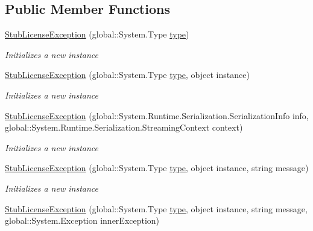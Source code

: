 \subsection*{Public Member Functions}
\begin{DoxyCompactItemize}
\item 
\hyperlink{class_system_1_1_component_model_1_1_fakes_1_1_stub_license_exception_a9083401910ae6269d240d9be7fb7ed57}{Stub\-License\-Exception} (global\-::\-System.\-Type \hyperlink{jquery-1_810_82-vsdoc_8js_a3940565e83a9bfd10d95ffd27536da91}{type})
\begin{DoxyCompactList}\small\item\em Initializes a new instance\end{DoxyCompactList}\item 
\hyperlink{class_system_1_1_component_model_1_1_fakes_1_1_stub_license_exception_a130bbaa9121179a905b6ed68ccc7aeab}{Stub\-License\-Exception} (global\-::\-System.\-Type \hyperlink{jquery-1_810_82-vsdoc_8js_a3940565e83a9bfd10d95ffd27536da91}{type}, object instance)
\begin{DoxyCompactList}\small\item\em Initializes a new instance\end{DoxyCompactList}\item 
\hyperlink{class_system_1_1_component_model_1_1_fakes_1_1_stub_license_exception_a918fa573c9aa307c31d91902c90c04b2}{Stub\-License\-Exception} (global\-::\-System.\-Runtime.\-Serialization.\-Serialization\-Info info, global\-::\-System.\-Runtime.\-Serialization.\-Streaming\-Context context)
\begin{DoxyCompactList}\small\item\em Initializes a new instance\end{DoxyCompactList}\item 
\hyperlink{class_system_1_1_component_model_1_1_fakes_1_1_stub_license_exception_af72de558124161a84322e83e6d399a6a}{Stub\-License\-Exception} (global\-::\-System.\-Type \hyperlink{jquery-1_810_82-vsdoc_8js_a3940565e83a9bfd10d95ffd27536da91}{type}, object instance, string message)
\begin{DoxyCompactList}\small\item\em Initializes a new instance\end{DoxyCompactList}\item 
\hyperlink{class_system_1_1_component_model_1_1_fakes_1_1_stub_license_exception_a4600c2e848676870c5680b2b36550477}{Stub\-License\-Exception} (global\-::\-System.\-Type \hyperlink{jquery-1_810_82-vsdoc_8js_a3940565e83a9bfd10d95ffd27536da91}{type}, object instance, string message, global\-::\-System.\-Exception inner\-Exception)

\end{DoxyCompactItemize}
